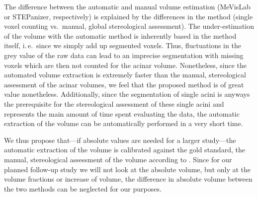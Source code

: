 \documentclass[twoside,paper=a4,abstract=true,english,DIVcalc]{scrartcl}
\newcommand{\ie}{i.\,e.\ }
\begin{document}
The difference between the automatic and manual volume estimation (MeVisLab or STEPanizer, respectively) is explained by the differences in the method (single voxel counting vs.\ manual, global stereological assessment). The under-estimation of the volume with the automatic method is inherently based in the method itself, \ie since we simply add up segmented voxels. Thus, fluctuations in the grey value of the raw data can lead to an imprecise segmentation with missing voxels which are then not counted for the acinar volume. Nonetheless, since the automated volume extraction is extremely faster than the manual, stereological assessment of the acinar volumes, we feel that the proposed method is of great value nonetheless. Additionally, since the segmentation of single acini is anyways the prerequisite for the stereological assessment of these single acini and represents the main amount of time spent evaluating the data, the automatic extraction of the volume can be automatically performed in a very short time.

We thus propose that---if absolute values are needed for a larger study---the automatic extraction of the volume is calibrated against the gold standard, the manual, stereological assessment of the volume according to \citet{Hsia2010}. Since for our planned follow-up study we will not look at the absolute volume, but only at the volume fractions or increase of volume, the difference in absolute volume between the two methods can be neglected for our purposes.
\end{document}
